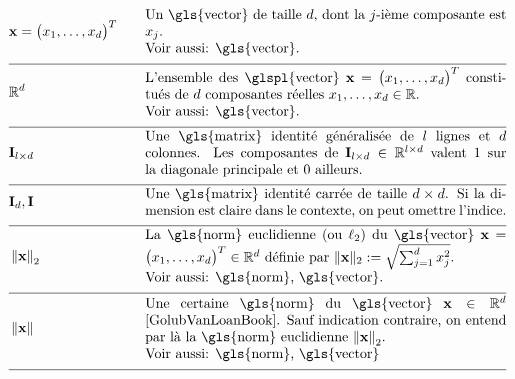 \begin{align} 
	&\featurevec=\big(\feature_{1},\ldots,\feature_{\featuredim}\big)^{T} &\quad & \parbox{.75\textwidth}{Un \gls{vector} de taille $\featuredim$, dont la $\featureidx$-ième composante est $\feature_{\featureidx}$.
	\\ Voir aussi: \gls{vector}.} \nonumber \\[2mm] \hline \nonumber\\[-5mm]
	&\mathbb{R}^{\featuredim} & \quad &  \parbox{.75\textwidth}{L’ensemble des \glspl{vector} $\featurevec=\big(\feature_{1},\ldots,\feature_{\featuredim}\big)^{T}$ constitués de $\featuredim$ composantes réelles $\feature_{1},\ldots,\feature_{\featuredim} \in \mathbb{R}$.
		\\ Voir aussi: \gls{vector}.} \nonumber \\[2mm] \hline \nonumber\\[-5mm]
	&\mathbf{I}_{\modelidx \times \featuredim}  & \quad &  \parbox{.75\textwidth}{Une \gls{matrix} identité généralisée de $\modelidx$ lignes et $\featuredim$ colonnes. Les composantes de $\mathbf{I}_{\modelidx \times \featuredim} \in \mathbb{R}^{\modelidx \times \featuredim}$ valent $1$ sur la diagonale principale et $0$ ailleurs.} \nonumber \\[2mm] \hline \nonumber\\[-5mm]
	&\mathbf{I}_{\dimlocalmodel}, \mathbf{I} & \quad &  \parbox{.75\textwidth}{Une \gls{matrix} identité carrée de taille $\dimlocalmodel \times \dimlocalmodel$. Si la dimension est claire dans le contexte, on peut omettre l'indice.} \nonumber \\[2mm] \hline \nonumber\\[-5mm]
	&\normgeneric{\featurevec}{2}  &\quad & \parbox{.75\textwidth}{La \gls{norm} euclidienne (ou $\ell_{2}$) du \gls{vector} $\featurevec=\big(\feature_{1},\ldots,\feature_{\featuredim}\big)^{T} \in \mathbb{R}^{\featuredim}$ définie par $ \| \featurevec \|_{2} \defeq \sqrt{\sum_{\featureidx=1}^{\featuredim} \feature_{\featureidx}^{2}}$.
		\\ Voir aussi: \gls{norm}, \gls{vector}.} \nonumber \\[2mm] \hline \nonumber\\[-5mm] 
	&\normgeneric{\featurevec}{}  & \quad &  \parbox{.75\textwidth}{Une certaine \gls{norm} du \gls{vector} $\featurevec \in \mathbb{R}^{\featuredim}$ \cite{GolubVanLoanBook}. Sauf indication contraire, on entend par là la \gls{norm} euclidienne $\normgeneric{\featurevec}{2}$.
		\\ Voir aussi: \gls{norm}, \gls{vector}} \nonumber \\[2mm] \hline \nonumber\\[-5mm]

\end{align}
